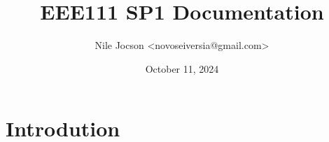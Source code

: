 \documentclass{article}
\title{EEE111 SP1 Documentation}
\author{Nile Jocson \textless{novoseiversia@gmail.com}\textgreater}
\date{October 11, 2024}
\begin{document}
	\maketitle
	\pagebreak

	\tableofcontents
	\pagebreak

	\section{Introdution}
\end{document}
